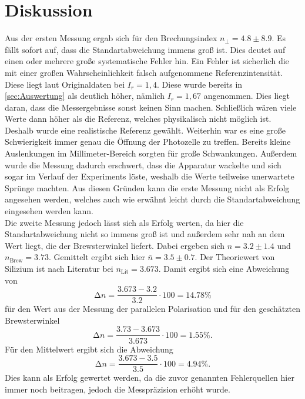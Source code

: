 \section{Diskussion}
\label{sec:Diskussion}

Aus der ersten Messung ergab sich für den Brechungsindex $n_{\perp} = 4.8 ± 8.9$.
Es fällt sofort auf, dass die Standartabweichung immens groß ist.
Dies deutet auf einen oder mehrere große systematische Fehler hin.
Ein Fehler ist sicherlich die mit einer großen Wahrscheinlichkeit falsch aufgenommene Referenzintensität.
Diese liegt laut Originaldaten bei $I_r = 1,4$.
Diese wurde bereits in \autoref{sec:Auswertung} als deutlich höher, nämlich $I_r = 1,67$ angenommen.
Dies liegt daran, dass die Messergebnisse sonst keinen Sinn machen.
Schließlich wären viele Werte dann höher als die Referenz, welches physikalisch nicht möglich ist.
Deshalb wurde eine realistische Referenz gewählt.
Weiterhin war es eine große Schwierigkeit immer genau die Öffnung der Photozelle zu treffen.
Bereits kleine Auslenkungen im Millimeter-Bereich sorgten für große Schwankungen. 
Außerdem wurde die Messung dadurch erschwert, dass die Apparatur wackelte und sich sogar im Verlauf der Experiments löste,
weshalb die Werte teilweise unerwartete Sprünge machten.
Aus diesen Gründen kann die erste Messung nicht als Erfolg angesehen werden, welches auch wie erwähnt leicht durch die Standartabweichung eingesehen werden kann. \\

Die zweite Messung jedoch lässt sich als Erfolg werten, da hier die Standartabweichung nicht so immens groß ist und außerdem
sehr nah an dem Wert liegt, die der Brewsterwinkel liefert.
Dabei ergeben sich $n = 3.2 \pm 1.4$ und $n_\text{Brew} = 3.73$.
Gemittelt ergibt sich hier $\bar{n} = 3.5 \pm 0.7$.
Der Theoriewert von Silizium ist nach Literatur \cite{brechungsindex} bei $n_\text{Lit} = 3.673$.
Damit ergibt sich eine Abweichung von
\begin{equation*}
    \increment n = \frac{3.673 - 3.2}{3.2} \cdot 100 = 14.78 \% 
\end{equation*}
für den Wert aus der Messung der parallelen Polarisation und für den geschätzten Brewsterwinkel
\begin{equation}
    \increment n = \frac{3.73 - 3.673}{3.673} \cdot 100 = 1.55 \% .
\end{equation}
Für den Mittelwert ergibt sich die Abweichung
\begin{equation*}
    \increment n = \frac{3.673 - 3.5}{3.5} \cdot 100 = 4.94 \% .
\end{equation*}
Dies kann als Erfolg gewertet werden, da die zuvor genannten Fehlerquellen hier immer noch beitragen, jedoch die
Messpräzision erhöht wurde.
